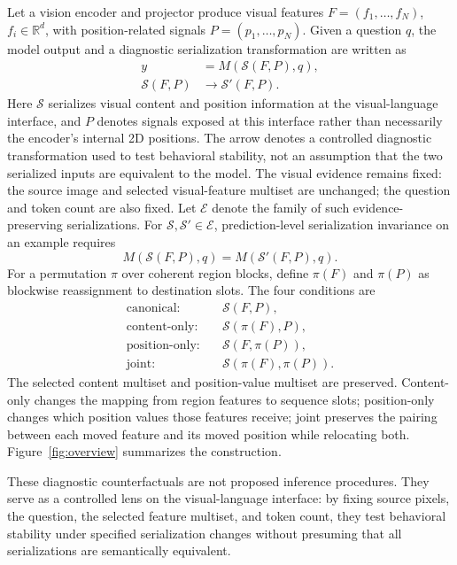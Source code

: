 \documentclass[10pt,twocolumn,letterpaper]{article}
\begin{document}
Let a vision encoder and projector produce visual features $F=(f_1,\ldots,f_N)$, $f_i\in\mathbb{R}^{d}$, with position-related signals $P=(p_1,\ldots,p_N)$.
Given a question $q$, the model output and a diagnostic serialization transformation are written as
\begin{align}
    y &= M\!\left(\mathcal{S}(F,P),q\right), \\
    \mathcal{S}(F,P) &\longrightarrow \mathcal{S}'(F,P).
\end{align}
Here $\mathcal{S}$ serializes visual content and position information at the visual-language interface, and $P$ denotes signals exposed at this interface rather than necessarily the encoder's internal 2D positions.
The arrow denotes a controlled diagnostic transformation used to test behavioral stability, not an assumption that the two serialized inputs are equivalent to the model.
The visual evidence remains fixed: the source image and selected visual-feature multiset are unchanged; the question and token count are also fixed.
Let $\mathcal{E}$ denote the family of such evidence-preserving serializations.
For $\mathcal{S},\mathcal{S}'\in\mathcal{E}$, prediction-level serialization invariance on an example requires
\begin{equation}
    M\!\left(\mathcal{S}(F,P),q\right)=M\!\left(\mathcal{S}'(F,P),q\right).
\end{equation}
For a permutation $\pi$ over coherent region blocks, define $\pi(F)$ and $\pi(P)$ as blockwise reassignment to destination slots.
The four conditions are
\begin{align}
    \text{canonical:}      &\quad \mathcal{S}(F,P), \\
    \text{content-only:}   &\quad \mathcal{S}(\pi(F),P), \\
    \text{position-only:}  &\quad \mathcal{S}(F,\pi(P)), \\
    \text{joint:}          &\quad \mathcal{S}(\pi(F),\pi(P)).
\end{align}
The selected content multiset and position-value multiset are preserved.
Content-only changes the mapping from region features to sequence slots; position-only changes which position values those features receive; joint preserves the pairing between each moved feature and its moved position while relocating both.
Figure~\ref{fig:overview} summarizes the construction.

These diagnostic counterfactuals are not proposed inference procedures.
They serve as a controlled lens on the visual-language interface: by fixing source pixels, the question, the selected feature multiset, and token count, they test behavioral stability under specified serialization changes without presuming that all serializations are semantically equivalent.
\end{document}
